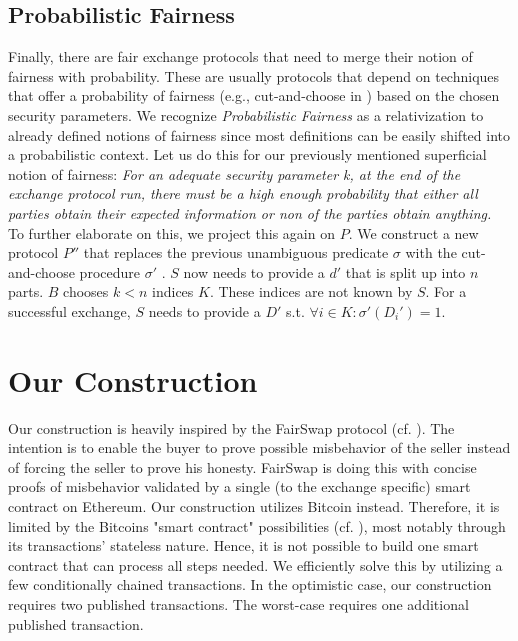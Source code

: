 \documentclass{cacthesis}
\newcounter{protocol}
\begin{document}
        \section{Probabilistic Fairness}
        Finally, there are fair exchange protocols that need to merge their notion of fairness with probability. These are usually protocols that depend on techniques that offer a probability of fairness (e.g., cut-and-choose in \cite{DELGADOSEGURA2020832}) based on the chosen security parameters. We recognize \textit{Probabilistic Fairness} as a relativization to already defined notions of fairness since most definitions can be easily shifted into a probabilistic context. Let us do this for our previously mentioned superficial notion of fairness: \textit{For an adequate security parameter k, at the end of the exchange protocol run, there must be a high enough probability that either all parties obtain their expected information or non of the parties obtain anything.} \\
        To further elaborate on this, we project this again on $P$. We construct a new protocol $P''$ that replaces the previous unambiguous predicate $\sigma$ with the cut-and-choose procedure $\sigma'$ . $S$ now needs to provide a $d'$ that is split up into $n$ parts. $B$ chooses $k < n$ indices $K$. These indices are not known by $S$. For a successful exchange, $S$ needs to provide a $D'$ s.t. $\forall i\in K:\sigma'\left( D_{i}'\right) =1$. \\

		
	\chapter{Our Construction}
	   Our construction is heavily inspired by the FairSwap protocol (cf. ). The intention is to enable the buyer to prove possible misbehavior of the seller instead of forcing the seller to prove his honesty. FairSwap is doing this with concise proofs of misbehavior validated by a single (to the exchange specific) smart contract on Ethereum. Our construction utilizes Bitcoin instead. Therefore, it is limited by the Bitcoins "smart contract" possibilities (cf. ), most notably through its transactions' stateless nature. Hence, it is not possible to build one smart contract that can process all steps needed. We efficiently solve this by utilizing a few conditionally chained transactions. In the optimistic case, our construction requires two published transactions. The worst-case requires one additional published transaction.
	   
\end{document}
